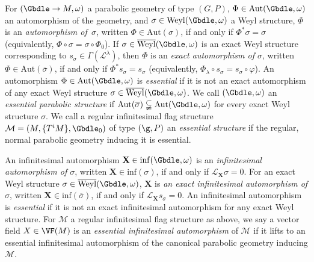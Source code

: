 \begin{Definition} \label{parabolic essential definition} For $(\Gbdle \rightarrow M,\omega)$ a parabolic geometry of type $(G,P)$, $\Phi \in \mathrm{Aut}(\Gbdle,\omega)$ an automorphism of the geometry, and $\sigma \in \mathrm{Weyl}(\Gbdle,\omega)$ a Weyl structure, $\Phi$ is an \emph{automorphism of~$\sigma$}, written $\Phi \in \mathrm{Aut}(\sigma)$, if and only if $\Phi^*\sigma = \sigma$ (equivalently, $\Phi \circ \sigma = \sigma \circ \Phi_0$). If $\sigma \in \overline{\mathrm{Weyl}}(\Gbdle,\omega)$ is an exact Weyl structure corresponding to $s_{\sigma} \in \Gamma(\mathcal{L}^{\lambda})$, then $\Phi$ is an \emph{exact automorphism of $\sigma$}, written $\Phi \in \mathrm{Aut}(\overline{\sigma})$, if and only if $\Phi^*s_{\sigma} = s_{\sigma}$ (equivalently, $\Phi_{\lambda} \circ s_{\sigma} = s_{\sigma} \circ \varphi$). An automorphism $\Phi \in \mathrm{Aut}(\Gbdle,\omega)$ is \emph{essential} if it is not an exact automorphism of any exact Weyl structure $\sigma \in \overline{\mathrm{Weyl}}(\Gbdle,\omega)$. We call $(\Gbdle,\omega)$ an \emph{essential parabolic structure} if $\mathrm{Aut}(\overline{\sigma}) \subsetneqq \mathrm{Aut}(\Gbdle,\omega)$ for every exact Weyl structure $\sigma$. We call a regular inf\/initesimal f\/lag structure $\mathcal{M} = (M,\{T^iM\},\Gbdle_0)$ of type $(\g,P)$ an \emph{essential structure} if the regular, normal parabolic geometry inducing it is essential.


An inf\/initesimal automorphism $\mathbf{X} \in \mathrm{inf}(\Gbdle,\omega)$ is an \emph{infinitesimal automorphism of $\sigma$}, written $\mathbf{X} \in \mathrm{inf}(\sigma)$, if and only if $\mathcal{L}_{\mathbf{X}} \sigma = 0$. For an exact Weyl structure $\sigma \in \overline{\mathrm{Weyl}}(\Gbdle,\omega)$, $\mathbf{X}$ is \emph{an exact infinitesimal automorphism of $\sigma$}, written $\mathbf{X} \in \mathrm{inf}(\overline{\sigma})$, if and only if $\mathcal{L}_{\mathbf{X}} s_{\sigma} = 0$. An inf\/initesimal automorphism is \emph{essential} if it is not an exact inf\/initesimal automorphism for any exact Weyl structure. For $\mathcal{M}$ a regular inf\/initesimal f\/lag structure as above, we say a vector f\/ield $X \in \VF(M)$ is an \emph{essential infinitesimal automorphism} of $\mathcal{M}$ if it lifts to an essential inf\/initesimal automorphism of the canonical parabolic geometry inducing $\mathcal{M}$.
\end{Definition}

